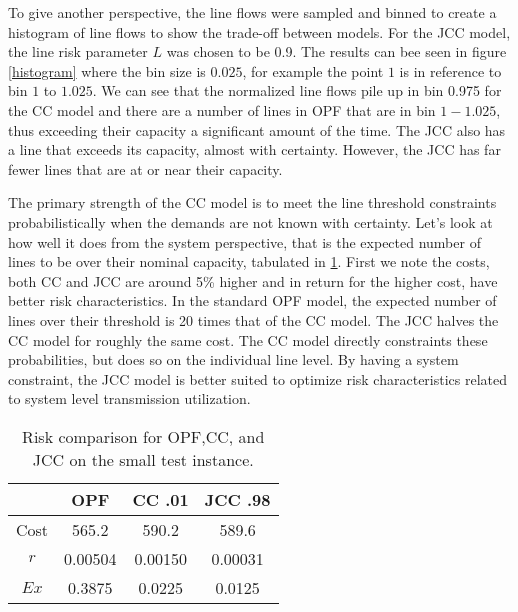 To give another perspective, the line flows were sampled and binned to create a histogram of line flows to show the trade-off between models.  For the JCC model, the line risk parameter $L$ was chosen to be 0.9.  The results can bee seen in figure \ref{histogram} where the bin size is $0.025$, for example the point $1$ is in reference to bin $1$ to $1.025$.  We can see that the normalized line flows pile up in bin 0.975 for the CC model and there are a number of lines in OPF that are in bin $1-1.025$, thus exceeding their capacity a significant amount of the time.  The JCC also has a line that exceeds its capacity, almost with certainty.  However, the JCC has far fewer lines that are at or near their capacity.



The primary strength of the CC model is to meet the line threshold constraints probabilistically when the demands are not known with certainty.  Let's look at how well it does from the system perspective, that is the expected number of lines to be over their nominal capacity, tabulated in \ref{solve_risk}.  First we note the costs, both CC and JCC are around 5\% higher and in return for the higher cost, have better risk characteristics.  In the standard OPF model, the expected number of lines over their threshold is 20 times that of the CC model.  The JCC halves the CC model for roughly the same cost.  The CC model directly constraints these probabilities, but does so on the individual line level.  By having a system constraint, the JCC model is better suited to optimize risk characteristics related to system level transmission utilization.


\begin{table}
\centering

 \begin{tabular}{ |c| c c c |}
\hline
& OPF & CC .01 & JCC .98 \\
\hline
\hline
Cost & 565.2 & 590.2 & 589.6 \\
$r$ & 0.00504 & 0.00150 & 0.00031 \\
\hline
$Ex$ & 0.3875 & 0.0225 & 0.0125 \\
\hline
\end{tabular}
\caption{Risk comparison for OPF,CC, and JCC on the small test instance.}\label{solve_risk}
\end{table}



